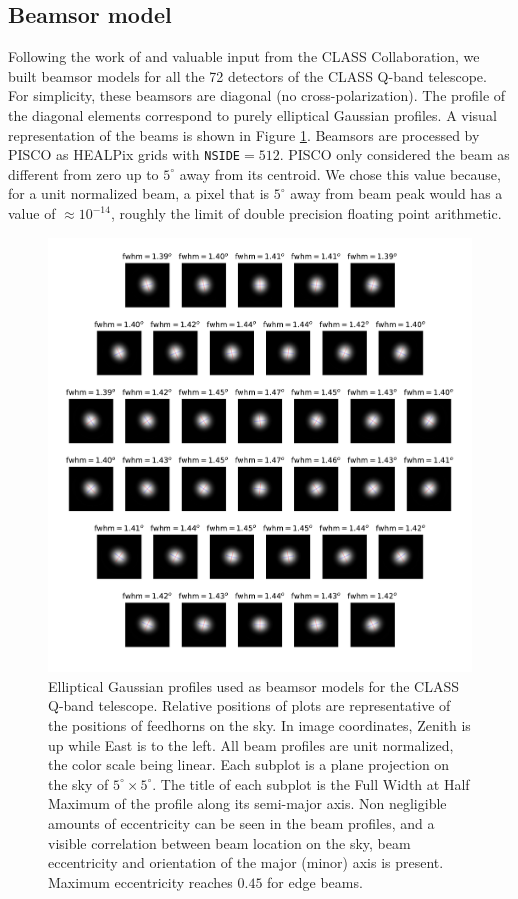 \documentclass[a4paper,11pt]{article}
\begin{document}
\subsection{Beamsor model}

Following the work of \cite{2012SPIE.8452E..20E} and valuable input from the CLASS Collaboration, we built beamsor models for all the 72 detectors of the CLASS Q-band telescope. For simplicity, these beamsors are diagonal (no cross-polarization). The profile of the diagonal elements correspond to purely elliptical Gaussian profiles. A visual representation of the beams is shown in Figure \ref{fig::qbandbeamsmainbeamfwhmx}. Beamsors are processed by PISCO as HEALPix grids with \texttt{NSIDE}$=512$. PISCO only considered the beam as different from zero up to $5^\circ$ away from its centroid. We chose this value because, for a unit normalized beam, a pixel that is $5^\circ$ away from beam peak would has a value of $\approx 10^{-14}$, roughly the limit of double precision floating point arithmetic. 

\begin{figure}
	\centering
	\includegraphics[width=0.8 \linewidth]{figures/qband_beams_main_beam_fwhm_x}
	\caption{Elliptical Gaussian profiles used as beamsor models for the CLASS Q-band telescope. Relative positions of plots are representative of the positions of feedhorns on the sky. In image coordinates, Zenith is up while East is to the left. All beam profiles are unit normalized, the color scale being linear. Each subplot is a plane projection on the sky of $5^\circ \times 5^\circ$. The title of each subplot is the Full Width at Half Maximum of the profile along its semi-major axis. Non negligible amounts of eccentricity can be seen in the beam profiles, and a visible correlation between beam location on the sky, beam eccentricity and orientation of the major (minor) axis is present. Maximum eccentricity reaches $0.45$ for edge beams.}
	\label{fig::qbandbeamsmainbeamfwhmx}
\end{figure}
\end{document}
